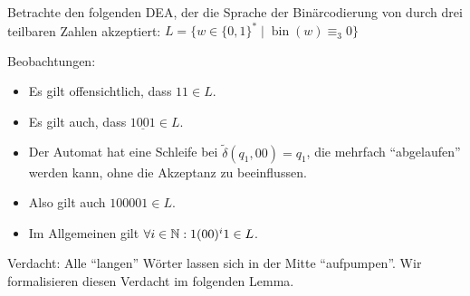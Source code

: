 \begin{Bsp}\label{bsp:2.mod3}
Betrachte den folgenden \ac{DEA}, der die Sprache der Binärcodierung von durch drei teilbaren Zahlen akzeptiert:
                $L = \{ w\in \{0,1\}^* \mid \operatorname{bin}(w)\equiv_3 0\}$
    \begin{center}
  \end{center}
  Beobachtungen:
  \begin{itemize}
  \item Es gilt offensichtlich, dass $11 \in L$.
  \item Es gilt auch, dass $1 \underline{0 0} 1 \in L$.
  \item Der Automat hat eine Schleife bei $\tilde\delta({q_1,00}) = q_1$, die mehrfach "`abgelaufen"' werden kann, ohne die Akzeptanz zu beeinflussen.
  \item Also gilt auch $100001 \in L$.
  \item Im Allgemeinen gilt $\forall i\in\mathbb{N}: 1(00)^i1 \in L$.
  \qedhere
  \end{itemize}
\end{Bsp}
Verdacht: Alle "`langen"' Wörter lassen sich in der Mitte "`aufpumpen"'.
Wir formalisieren diesen Verdacht im folgenden Lemma.

